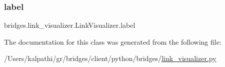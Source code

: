 \subsubsection{\texorpdfstring{label}{label}}
{\footnotesize\ttfamily bridges.\+link\+\_\+visualizer.\+Link\+Visualizer.\+label}



The documentation for this class was generated from the following file\+:\begin{DoxyCompactItemize}
\item 
/\+Users/kalpathi/gr/bridges/client/python/bridges/\mbox{\hyperlink{link__visualizer_8py}{link\+\_\+visualizer.\+py}}\end{DoxyCompactItemize}
